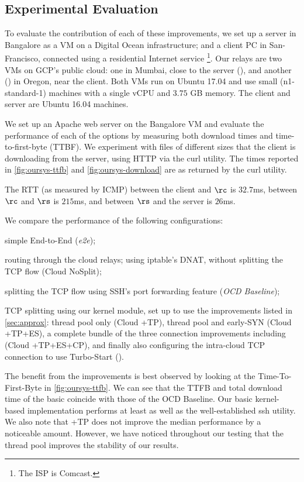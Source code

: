 \subsection{Experimental Evaluation}\label{subsec:improving-baseline}
To evaluate the contribution of each of these improvements, we set up a server in Bangalore as a VM on a Digital Ocean infrastructure; and a client PC in San-Francisco, connected using a residential Internet service \footnote{The ISP is Comcast.}. Our relays are two VMs on GCP's public cloud: one in Mumbai, close to the server (\rs), and another (\rc)  in Oregon, near the client. Both VMs run on Ubuntu 17.04 and use small (n1-standard-1) machines with a single vCPU and $3.75$ GB memory. The client and server are Ubuntu 16.04 machines.

We set up an Apache web server on the Bangalore VM and evaluate the performance of each of the options by measuring both download times and time-to-first-byte (TTBF). We experiment with files of different sizes that the client is downloading from the server, using HTTP via the curl utility. The times reported in \autoref{fig:oursys-ttfb} and \autoref{fig:oursys-download}  are as returned by the curl utility. 

The RTT  (as measured by ICMP) between the client and $\rc$ is $32.7$ms, between $\rc$ and $\rs$ is $215$ms, and between $\rs$ and the server is $26$ms.

We compare the performance of the following configurations: \begin{romanlist}
     \item simple End-to-End (\textit{e2e});
     \item routing through the cloud relays; using iptable's DNAT, without splitting the TCP flow (Cloud NoSplit);
     \item splitting the TCP flow using SSH's port forwarding feature (\textit{OCD Baseline});
     \item TCP splitting using our \oursys kernel module, set up to use the improvements listed in \autoref{sec:approx}: thread pool only (Cloud \oursys+TP), thread pool and early-SYN (Cloud \oursys+TP+ES), a complete bundle of the three connection improvements including \reconn (Cloud \oursys+TP+ES+CP), and finally also configuring the intra-cloud TCP connection to use Turbo-Start (\textit{\oursys}).
\end{romanlist}

The benefit from the improvements is best observed by looking at the Time-To-First-Byte in \autoref{fig:oursys-ttfb}. We can see that the  TTFB and total download time of the basic \oursys coincide with those of the OCD Baseline. Our basic kernel-based implementation performs at least as well as the well-established ssh utility. We also note that \oursys+TP does not improve the median performance by a noticeable amount. However, we have noticed throughout our testing that the thread pool improves the stability of our results.

